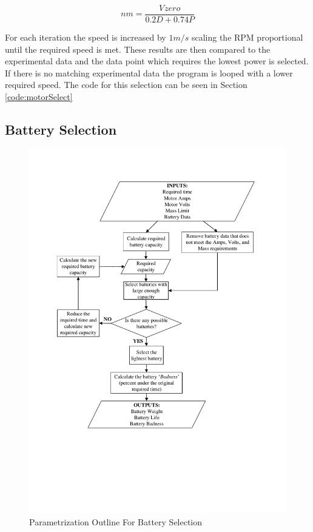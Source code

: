 \documentclass[../main.tex]{subfiles}
\begin{document}
\begin{equation}
nm = \frac{V_{}zero}{0.2D+0.74P}
\end{equation}

For each iteration the speed is increased by $1m/s$ scaling the RPM proportional until the required speed is met. These results are then compared to the experimental data and the data point which requires the lowest power is selected. If there is no matching experimental data the program is looped with a lower required speed. The code for this selection can be seen in Section \ref{code:motorSelect}

\subsection{Battery Selection} \label{batterySelect}

\begin{figure}[H]
	\centering
	\includegraphics[width=0.95\linewidth]{img/paramaterization/batteryChoice.pdf}
	\caption{Parametrization Outline For Battery Selection}
	\label{fig:batteryOutline}
\end{figure}
\end{document}
